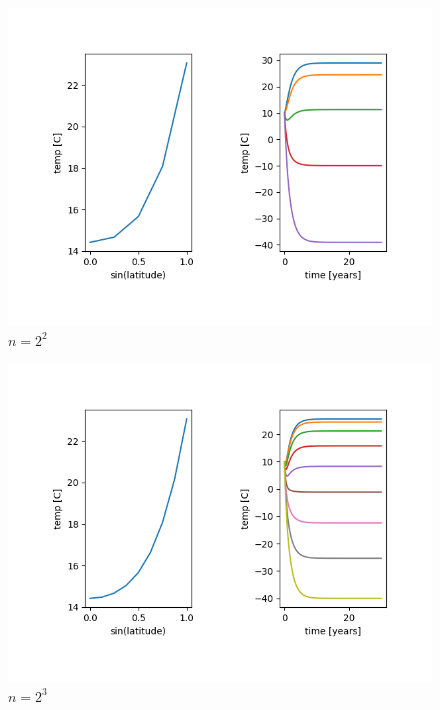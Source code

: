 \documentclass{article}
\theoremstyle{remark}
\begin{document}
\begin{figure}
\centering
\includegraphics{n2e2.png}
\caption{$n = 2^2$}
\end{figure}

\begin{figure}
\centering
\includegraphics{n2e3.png}
\caption{$n = 2^3$}
\end{figure}
\end{document}
